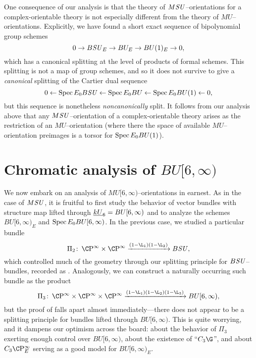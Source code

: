 \begin{remark}
One consequence of our analysis is that the theory of $M\mathit{SU}$--orientations for a complex-orientable theory is not especially different from the theory of $MU$--orientations.  Explicitly, we have found a short exact sequence of bipolynomial group schemes \[0 \to B\mathit{SU}_E \to BU_E \to BU(1)_E \to 0,\] which has a canonical splitting at the level of products of formal schemes.  This splitting is not a map of group schemes, and so it does not survive to give a \emph{canonical} splitting of the Cartier dual sequence \[0 \leftarrow \operatorname{Spec} E_0 B\mathit{SU} \leftarrow \operatorname{Spec} E_0 BU \leftarrow \operatorname{Spec} E_0 BU(1) \leftarrow 0,\] but this sequence is nonetheless \emph{noncanonically} split.  It follows from our analysis above that any $M\mathit{SU}$--orientation of a complex-orientable theory arises as the restriction of an $MU$--orientation (where there the space of available $MU$--orientation preimages is a torsor for $\operatorname{Spec} E_0 BU(1)$).
\end{remark}












\section{Chromatic analysis of \texorpdfstring{$BU[6, \infty)$}{BU[6, oo)}}\label{ChromaticKUCoopnsSection}

We now embark on an analysis of $MU[6, \infty)$--orientations in earnest.  As in the case of $M\mathit{SU}$, it is fruitful to first study the behavior of vector bundles with structure map lifted through $\underline{\smash{kU}}_{6} = BU[6, \infty)$ and to analyze the schemes $BU[6, \infty)_E$ and $\operatorname{Spec} E_0 BU[6, \infty)$.  In the previous case, we studied a particular bundle \[\Pi_2\co \CP^\infty \times \CP^\infty \xrightarrow{(1 - \L_1)(1 - \L_2)} B\SU,\] which controlled much of the geometry through our splitting principle for $B\mathit{SU}$--bundles, recorded as .  Analogously, we can construct a naturally occurring such bundle as the product \[\Pi_3\co \CP^\infty \times \CP^\infty \times \CP^\infty \xrightarrow{(1 - \L_1)(1 - \L_2)(1 - \L_3)} BU[6, \infty),\] but the proof of  falls apart almost immediately---there does not appear to be a splitting principle for bundles lifted through $BU[6, \infty)$.  This is quite worrying, and it dampens our optimism across the board: about the behavior of $\Pi_3$ exerting enough control over $BU[6, \infty)$, about the existence of ``$C_3 \G$'', and about $C_3 \CP^\infty_E$ serving as a good model for $BU[6, \infty)_E$.

